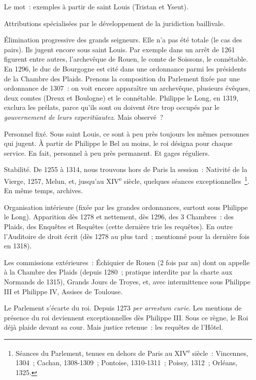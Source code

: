 \documentclass[french,twoside]{book} %
\newcommand\chapterclose{} %
\begin{document}
\noindent Le mot : exemples à partir de saint Louis (Tristan et Yseut).\par
Attributions spécialisées par le développement de la juridiction baillivale.\par
Élimination progressive des grands seigneurs. Elle n’a pas été totale (le cas des pairs). Ils jugent encore sous saint Louis. Par exemple dans un arrêt de 1261 figurent entre autres, l’archevêque de Rouen, le comte de Soissons, le connétable. En 1296, le duc de Bourgogne est cité dans une ordonnance parmi les présidents de la Chambre des Plaids. Prenons la composition du Parlement fixée par une ordonnance de 1307 : on voit encore apparaître un archevêque, plusieurs évêques, deux comtes (Dreux et Boulogne) et le connétable. Philippe le Long, en 1319, exclura les prélats, parce qu’ils sont ou  
\label{p44} doivent être trop occupés par le \emph{gouvernement de leurs experitüautez}. Mais observé ?\par
Personnel fixé. Sous saint Louis, ce sont à peu près toujours les mêmes personnes qui jugent. À partir de Philippe le Bel au moins, le roi désigna pour chaque service. En fait, personnel à peu près permanent. Et gages réguliers.\par
Stabilité. De 1255 à 1314, nous trouvons hors de Paris la session : Nativité de la Vierge, 1257, Melun, et, jusqu’au XIV\textsuperscript{e} siècle, quelques séances exceptionnelles \footnote{ Séances du Parlement, tenues en dehors de Paris au XIV\textsuperscript{e} siècle : Vincennes, 1304 ; Cachan, 1308-1309 ; Pontoise, 1310-1311 ; Poissy, 1312 ; Orléans, 1325.}. En même temps, archives.\par
Organisation intérieure (fixée par les grandes ordonnances, surtout sous Philippe le Long). Apparition dès 1278 et nettement, dès 1296, des 3 Chambres : des Plaids, des Enquêtes et Requêtes (cette dernière trie les requêtes). En outre l’Auditoire de droit écrit (dès 1278 au plus tard ; mentionné pour la dernière fois en 1318).\par
Les commissions extérieures : Échiquier de Rouen (2 fois par an) dont on appelle à la Chambre des Plaids (depuis 1280 ; pratique interdite par la charte aux Normands de 1315), Grands Jours de Troyes, et, avec intermittence sous Philippe III et Philippe IV, Assises de Toulouse.\par
Le Parlement s’écarte du roi. Depuis 1273 \emph{per arrestum curie}. Les mentions de présence du roi deviennent exceptionnelles dès Philippe III. Sous ce règne, le Roi déjà plaide devant sa cour. Mais justice retenue : les requêtes de l’Hôtel.
\chapterclose
\end{document}
